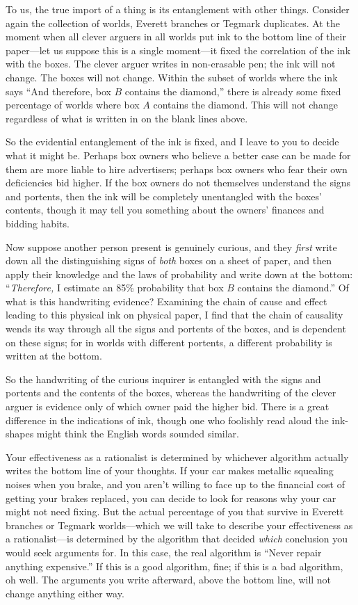 {
 To us, the true import of a thing is its entanglement with other
things. Consider again the collection of worlds, Everett branches or
Tegmark duplicates. At the moment when all clever arguers in all worlds
put ink to the bottom line of their paper---let us suppose this is a
single moment---it fixed the correlation of the ink with the boxes. The
clever arguer writes in non-erasable pen; the ink will not change. The
boxes will not change. Within the subset of worlds where the ink says
``And therefore, box $B$ contains the
diamond,'' there is already some fixed percentage of
worlds where box $A$ contains the diamond. This will not change
regardless of what is written in on the blank lines above.}

{
 So the evidential entanglement of the ink is fixed, and I leave to
you to decide what it might be. Perhaps box owners who believe a better
case can be made for them are more liable to hire advertisers; perhaps
box owners who fear their own deficiencies bid higher. If the box
owners do not themselves understand the signs and portents, then the
ink will be completely unentangled with the boxes'
contents, though it may tell you something about the
owners' finances and bidding habits.}

{
 Now suppose another person present is genuinely curious, and they
\textit{first} write down all the distinguishing signs of \textit{both}
boxes on a sheet of paper, and then apply their knowledge and the laws
of probability and write down at the bottom:
``\textit{Therefore,} I estimate an 85\% probability
that box $B$ contains the diamond.'' Of what is this
handwriting evidence? Examining the chain of cause and effect leading
to this physical ink on physical paper, I find that the chain of
causality wends its way through all the signs and portents of the
boxes, and is dependent on these signs; for in worlds with different
portents, a different probability is written at the bottom.}

{
 So the handwriting of the curious inquirer is entangled with the
signs and portents and the contents of the boxes, whereas the
handwriting of the clever arguer is evidence only of which owner paid
the higher bid. There is a great difference in the indications of ink,
though one who foolishly read aloud the ink-shapes might think the
English words sounded similar.}

{
 Your effectiveness as a rationalist is determined by whichever
algorithm actually writes the bottom line of your thoughts. If your car
makes metallic squealing noises when you brake, and you
aren't willing to face up to the financial cost of
getting your brakes replaced, you can decide to look for reasons why
your car might not need fixing. But the actual percentage of you that
survive in Everett branches or Tegmark worlds---which we will take to
describe your effectiveness as a rationalist---is determined by the
algorithm that decided \textit{which} conclusion you would seek
arguments for. In this case, the real algorithm is
``Never repair anything expensive.''
If this is a good algorithm, fine; if this is a bad algorithm, oh well.
The arguments you write afterward, above the bottom line, will not
change anything either way.}


